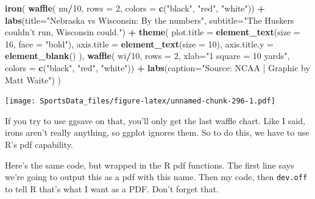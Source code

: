 \documentclass[
]{book}
\newenvironment{Shaded}{\begin{snugshade}}{\end{snugshade}}
\newcommand{\DataTypeTok}[1]{\textcolor[rgb]{0.13,0.29,0.53}{#1}}
\newcommand{\DecValTok}[1]{\textcolor[rgb]{0.00,0.00,0.81}{#1}}
\newcommand{\KeywordTok}[1]{\textcolor[rgb]{0.13,0.29,0.53}{\textbf{#1}}}
\newcommand{\NormalTok}[1]{#1}
\newcommand{\OperatorTok}[1]{\textcolor[rgb]{0.81,0.36,0.00}{\textbf{#1}}}
\newcommand{\StringTok}[1]{\textcolor[rgb]{0.31,0.60,0.02}{#1}}
\begin{document}
\begin{Shaded}
\begin{Highlighting}[]
\KeywordTok{iron}\NormalTok{(}
 \KeywordTok{waffle}\NormalTok{(}
\NormalTok{   nu}\OperatorTok{/}\DecValTok{10}\NormalTok{, }
   \DataTypeTok{rows =} \DecValTok{2}\NormalTok{, }
   \DataTypeTok{colors =} \KeywordTok{c}\NormalTok{(}\StringTok{"black"}\NormalTok{, }\StringTok{"red"}\NormalTok{, }\StringTok{"white"}\NormalTok{)) }\OperatorTok{+}\StringTok{ }
\StringTok{   }\KeywordTok{labs}\NormalTok{(}\DataTypeTok{title=}\StringTok{"Nebraska vs Wisconsin: By the numbers"}\NormalTok{, }\DataTypeTok{subtitle=}\StringTok{"The Huskers couldn't run, Wisconsin could."}\NormalTok{) }\OperatorTok{+}\StringTok{ }
\StringTok{   }\KeywordTok{theme}\NormalTok{(}
    \DataTypeTok{plot.title =} \KeywordTok{element_text}\NormalTok{(}\DataTypeTok{size =} \DecValTok{16}\NormalTok{, }\DataTypeTok{face =} \StringTok{"bold"}\NormalTok{),}
    \DataTypeTok{axis.title =} \KeywordTok{element_text}\NormalTok{(}\DataTypeTok{size =} \DecValTok{10}\NormalTok{),}
    \DataTypeTok{axis.title.y =} \KeywordTok{element_blank}\NormalTok{()}
\NormalTok{  ),}
 \KeywordTok{waffle}\NormalTok{(}
\NormalTok{   wi}\OperatorTok{/}\DecValTok{10}\NormalTok{, }
   \DataTypeTok{rows =} \DecValTok{2}\NormalTok{, }
   \DataTypeTok{xlab=}\StringTok{"1 square = 10 yards"}\NormalTok{, }
   \DataTypeTok{colors =} \KeywordTok{c}\NormalTok{(}\StringTok{"black"}\NormalTok{, }\StringTok{"red"}\NormalTok{, }\StringTok{"white"}\NormalTok{)) }\OperatorTok{+}\StringTok{ }\KeywordTok{labs}\NormalTok{(}\DataTypeTok{caption=}\StringTok{"Source: NCAA | Graphic by Matt Waite"}\NormalTok{)}
\NormalTok{) }
\end{Highlighting}
\end{Shaded}

\texttt{[image: SportsData\_files/figure-latex/unnamed-chunk-296-1.pdf]}

If you try to use ggsave on that, you'll only get the last waffle chart. Like I said, irons aren't really anything, so ggplot ignores them. So to do this, we have to use R's pdf capability.

Here's the same code, but wrapped in the R pdf functions. The first line says we're going to output this as a pdf with this name. Then my code, then \texttt{dev.off} to tell R that's what I want as a PDF. Don't forget that.
\end{document}
